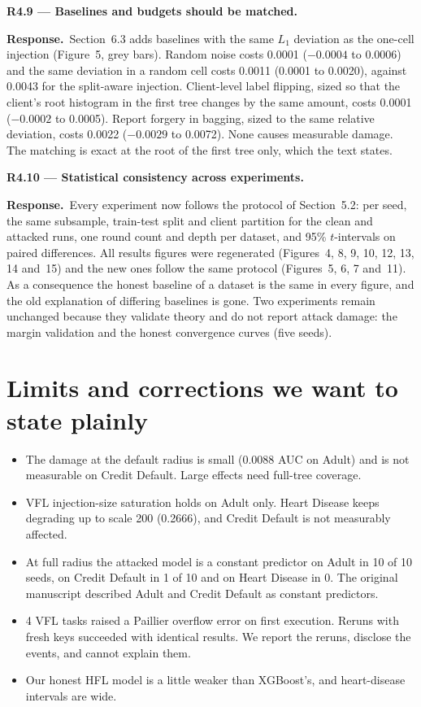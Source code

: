 \documentclass[11pt]{article}
\newcommand{\point}[1]{\par\medskip\noindent\textbf{\textcolor{blue!50!black}{#1}}\par}
\newcommand{\reply}{\noindent\textbf{Response.}\ }
\begin{document}
\point{R4.9 --- Baselines and budgets should be matched.}
\reply Section~6.3 adds baselines with the same $L_1$ deviation as the one-cell injection (Figure~5, grey bars). Random noise costs 0.0001 ($-0.0004$ to 0.0006) and the same deviation in a random cell costs 0.0011 (0.0001 to 0.0020), against 0.0043 for the split-aware injection. Client-level label flipping, sized so that the client's root histogram in the first tree changes by the same amount, costs 0.0001 ($-0.0002$ to 0.0005). Report forgery in bagging, sized to the same relative deviation, costs 0.0022 ($-0.0029$ to 0.0072). None causes measurable damage. The matching is exact at the root of the first tree only, which the text states.

\point{R4.10 --- Statistical consistency across experiments.}
\reply Every experiment now follows the protocol of Section~5.2: per seed, the same subsample, train-test split and client partition for the clean and attacked runs, one round count and depth per dataset, and 95\% $t$-intervals on paired differences. All results figures were regenerated (Figures~4, 8, 9, 10, 12, 13, 14 and~15) and the new ones follow the same protocol (Figures~5, 6, 7 and~11). As a consequence the honest baseline of a dataset is the same in every figure, and the old explanation of differing baselines is gone. Two experiments remain unchanged because they validate theory and do not report attack damage: the margin validation and the honest convergence curves (five seeds).

\section*{Limits and corrections we want to state plainly}
\begin{itemize}
\item The damage at the default radius is small (0.0088 AUC on Adult) and is not measurable on Credit Default. Large effects need full-tree coverage.
\item VFL injection-size saturation holds on Adult only. Heart Disease keeps degrading up to scale 200 (0.2666), and Credit Default is not measurably affected.
\item At full radius the attacked model is a constant predictor on Adult in 10 of 10 seeds, on Credit Default in 1 of 10 and on Heart Disease in 0. The original manuscript described Adult and Credit Default as constant predictors.
\item 4 VFL tasks raised a Paillier overflow error on first execution. Reruns with fresh keys succeeded with identical results. We report the reruns, disclose the events, and cannot explain them.
\item Our honest HFL model is a little weaker than XGBoost's, and heart-disease intervals are wide.
\end{itemize}
\end{document}
